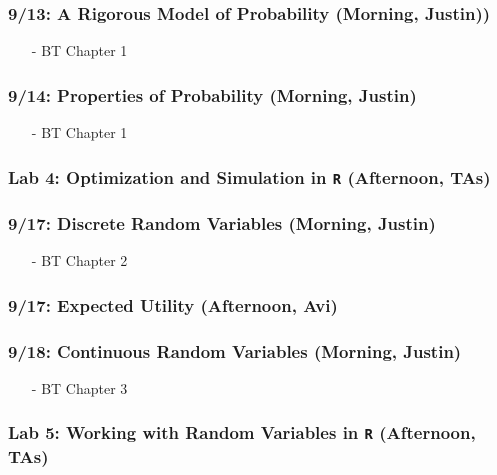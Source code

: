 \documentclass[11pt,letterpaper]{article}
\numberwithin{equation}{section}
\begin{document}
\subsubsection*{9/13: A Rigorous Model of Probability (Morning, Justin))}
\begin{itemize}
\item[-] BT Chapter 1
\end{itemize}



\subsubsection*{9/14: Properties of Probability (Morning, Justin)}

\begin{itemize}
\item[-] BT Chapter 1
\end{itemize}


\subsubsection*{Lab 4: Optimization and Simulation in {\tt R} (Afternoon, TAs)}




\subsubsection*{9/17: Discrete Random Variables (Morning, Justin)}

\begin{itemize}
\item[-] BT Chapter 2
\end{itemize}

\subsubsection*{9/17: Expected Utility (Afternoon, Avi)}



\subsubsection*{9/18: Continuous Random Variables (Morning, Justin)}

\begin{itemize}
\item[-] BT Chapter 3
\end{itemize}


\subsubsection*{Lab 5: Working with Random Variables in {\tt R} (Afternoon, TAs)}
\end{document}
